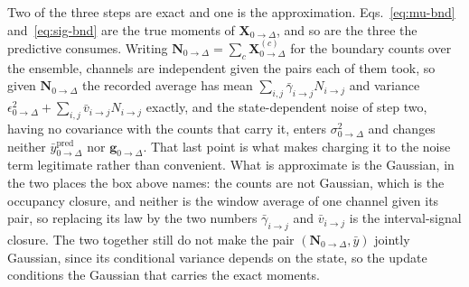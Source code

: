 Two of the three steps are exact and one is the approximation. Eqs.~\ref{eq:mu-bnd}
and~\ref{eq:sig-bnd} are the true moments of $\mathbf{X}_{0\to\Delta}$, and so are the three
the predictive consumes. Writing $\mathbf{N}_{0\to\Delta}=\sum_c\mathbf{X}^{(c)}_{0\to\Delta}$
for the boundary counts over the ensemble, channels are independent given the pairs each of
them took, so given $\mathbf{N}_{0\to\Delta}$ the recorded average has mean
$\sum_{i,j}\bar{\gamma}_{i\to j}N_{i\to j}$ and variance
$\epsilon^2_{0\to\Delta} + \sum_{i,j}\bar{v}_{i\to j}N_{i\to j}$
exactly, and the state-dependent noise of step two, having no covariance with the counts that
carry it, enters $\sigma^2_{0\to\Delta}$ and changes neither $\bar{y}^{\mathrm{pred}}_{0\to\Delta}$ nor
$\mathbf{g}_{0\to\Delta}$. That last point is what makes charging it to the noise term legitimate rather
than convenient. What is
approximate is the Gaussian, in the two places the box above names: the counts are not
Gaussian, which is the occupancy closure, and neither is the window average of one channel
given its pair, so replacing its law by the two numbers $\bar{\gamma}_{i\to j}$ and
$\bar{v}_{i\to j}$ is the interval-signal closure. The two together still do not make
the pair $(\mathbf{N}_{0\to\Delta},\bar{y})$ jointly Gaussian, since its conditional variance
depends on the state, so the update conditions the Gaussian that carries the exact moments.
%
